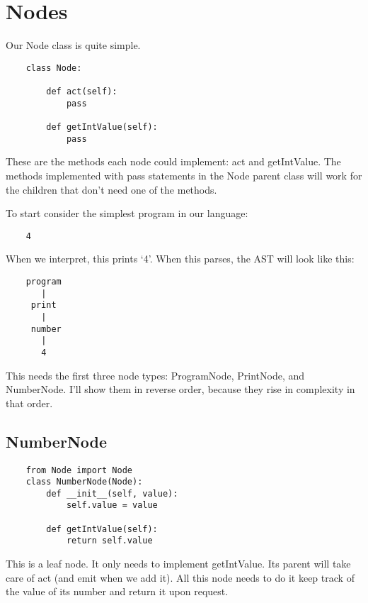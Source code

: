 \section{Nodes}

Our Node class is quite simple.

{\footnotesize
\begin{verbatim}
    class Node:

        def act(self):
            pass

        def getIntValue(self):
            pass
\end{verbatim}
}

These are the methods each node could implement: act and getIntValue.
The methods implemented with pass statements in the Node parent class
will work for the children that don't need one of the methods.

To start consider the simplest program in our language:

{\footnotesize
\begin{verbatim}
    4
\end{verbatim}
}

When we interpret, this prints `4'.
When this parses, the AST will look like this:

{\footnotesize
\begin{verbatim}
    program
       |
     print
       |
     number
       |
       4
\end{verbatim}
}

This needs the first three node types: ProgramNode, PrintNode, and NumberNode.
I'll show them in reverse order, because they rise in complexity in that
order.

\subsection{NumberNode}

{\footnotesize
\begin{verbatim}
    from Node import Node
    class NumberNode(Node):
        def __init__(self, value):
            self.value = value

        def getIntValue(self):
            return self.value
\end{verbatim}
}

This is a leaf node. It only needs to implement getIntValue.
Its parent will take care of act (and emit when we add it).
All this node needs to do it keep track of the value of its
number and return it upon request.

